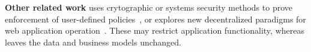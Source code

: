 \textbf{Other related work} uses crytographic or systems security methods to
prove enforcement of user-defined policies~\cite{zeph, riverbed}, or explores
new decentralized paradigms for web application operation~\cite{solid, bstore,
databox, diy, amber, oort, w5, blockstack}.  These may restrict application
functionality, whereas \sys leaves the data and business models unchanged.
%
%
%
%
%
